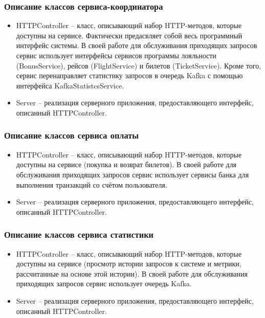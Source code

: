 \subsubsection{Описание классов сервиса-координатора}

\begin{itemize}
    \item HTTPController -- класс, описывающий набор  HTTP-методов, которые доступны на сервисе. Фактически предасвляет собой весь программный интерфейс системы. В своей работе для обслуживания приходящих запросов сервис использует интерфейсы сервисов программы лояльности (BonusService), рейсов (FlightService) и билетов (TicketService). Кроме того, сервис перенаправляет статистику запросов в очередь Kafka с помощью интерфейса KafkaStatistcsService.
    \item Server -- реализация серверного приложения, предоставляющего интерфейс, описанный HTTPController.
\end{itemize}

\subsubsection{Описание классов сервиса оплаты}

\begin{itemize}
    \item HTTPController -- класс, описывающий набор  HTTP-методов, которые доступны на сервисе (покупка и возврат билетов). В своей работе для обслуживания приходящих запросов сервис использует сервисы банка для выполнения транзакций со счётом пользователя.
    \item Server -- реализация серверного приложения, предоставляющего интерфейс, описанный HTTPController.
\end{itemize}

\subsubsection{Описание классов сервиса статистики}
\begin{itemize}
    \item HTTPController -- класс, описывающий набор  HTTP-методов, которые доступны на сервисе (просмотр истории запросов к системе и метрики, рассчитанные на основе этой истории). В своей работе для обслуживания приходящих запросов сервис использует очередь Kafka.
    \item Server -- реализация серверного приложения, предоставляющего интерфейс, описанный HTTPController.
\end{itemize}

